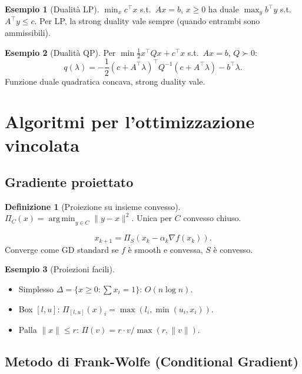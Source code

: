 \documentclass[11pt, a4paper, twoside]{book}
\theoremstyle{definition}
\newtheorem{defn}{Definizione}[chapter]
\newtheorem{example}{Esempio}[chapter]
\theoremstyle{plain}
\theoremstyle{remark}
\DeclareMathOperator*{\argmin}{arg\,min}
\begin{document}
\begin{example}[Dualità LP]
$\min_x c^\top x$ s.t.\ $Ax = b$, $x \geq 0$ ha duale $\max_y b^\top y$ s.t.\ $A^\top y \leq c$. Per LP, la strong duality vale sempre (quando entrambi sono ammissibili).
\end{example}

\begin{example}[Dualità QP]
Per $\min \frac{1}{2}x^\top Q x + c^\top x$ s.t.\ $Ax = b$, $Q \succ 0$:
\[
  q(\lambda) = -\frac{1}{2}(c + A^\top\lambda)^\top Q^{-1}(c + A^\top\lambda) - b^\top\lambda.
\]
Funzione duale quadratica concava, strong duality vale.
\end{example}

\section{Algoritmi per l'ottimizzazione vincolata}

\subsection{Gradiente proiettato}

\begin{defn}[Proiezione su insieme convesso]
$\Pi_C(x) = \argmin_{y \in C} \|y - x\|^2$. Unica per $C$ convesso chiuso.
\end{defn}

\begin{algobox}
\[
  x_{k+1} = \Pi_S(x_k - \alpha_k \nabla f(x_k)).
\]
Converge come GD standard se $f$ è smooth e convessa, $S$ è convesso.
\end{algobox}

\begin{example}[Proiezioni facili]
\begin{itemize}
  \item Simplesso $\Delta = \{x \geq 0: \sum x_i = 1\}$: $O(n \log n)$.
  \item Box $[l, u]$: $\Pi_{[l,u]}(x)_i = \max(l_i, \min(u_i, x_i))$.
  \item Palla $\|x\| \leq r$: $\Pi(v) = r \cdot v / \max(r, \|v\|)$.
\end{itemize}
\end{example}

\subsection{Metodo di Frank-Wolfe (Conditional Gradient)}
\label{sec:frank-wolfe}
\end{document}
